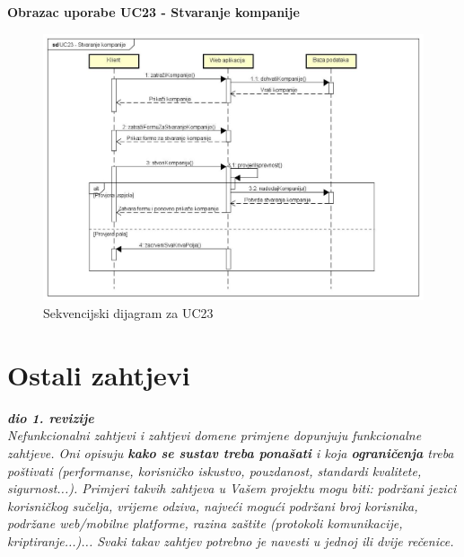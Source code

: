 				\textbf{Obrazac uporabe UC23 - Stvaranje kompanije}


				\begin{figure}[H]
					\includegraphics[scale=0.4]{slike/Sekvencijski dijagrami/UC23 - Stvaranje kompanije}
					\centering
					\caption{Sekvencijski dijagram za UC23}
					\label{fig:UC23}
				\end{figure}

			\eject
	
		\section{Ostali zahtjevi}
		
			\textbf{\textit{dio 1. revizije}}\\

			 \textit{Nefunkcionalni zahtjevi i zahtjevi domene primjene dopunjuju funkcionalne zahtjeve. Oni opisuju \textbf{kako se sustav treba ponašati} i koja \textbf{ograničenja} treba poštivati (performanse, korisničko iskustvo, pouzdanost, standardi kvalitete, sigurnost...). Primjeri takvih zahtjeva u Vašem projektu mogu biti: podržani jezici korisničkog sučelja, vrijeme odziva, najveći mogući podržani broj korisnika, podržane web/mobilne platforme, razina zaštite (protokoli komunikacije, kriptiranje...)... Svaki takav zahtjev potrebno je navesti u jednoj ili dvije rečenice.}\\

